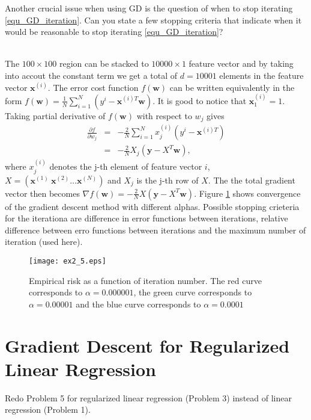 \documentclass[article,11pt]{article}
\begin{document}
Another crucial issue when using GD is the question of when to stop iterating \eqref{equ_GD_iteration}. Can you 
state a few stopping criteria that indicate when it would be reasonable to stop iterating \eqref{equ_GD_iteration}?

\\
The  $100\times 100$ region can be stacked to $10000\times 1$ feature vector and
by taking into accout the constant term we get a total of $d =10001$ elements in
the feature vector $\mathbf{x}^{(i)}$. The error cost function $f(\mathbf{w})$
can be written equivalently in the form $f(\mathbf{w})=\frac{1}{N}\sum_{i=1}^N(y^i-\mathbf{x}^{(i)T}\mathbf{w})$. It is good to notice that  $\mathbf{x}_1^{(i)}=1$. Taking partial derivative of $f(\mathbf{w})$ with respect to $w_j$ gives
\begin{eqnarray}
  \frac{\partial f}{\partial w_j} &=&-\frac{2}{N}\sum_{i=1}^Nx_j^{(i)}(y^i-\mathbf{x}^{(i)T})\nonumber\\
  &=&-\frac{2}{N}X_j(\mathbf{y}-X^T\mathbf{w}),
  \label{eq:partial-derivative}
\end{eqnarray}
where $x_j^{(i)}$ denotes the j-th element of feature vector $i$, $X=(\mathbf{x}^{(1)}\:\mathbf{x}^{(2)} \ldots \mathbf{x}^{(N)})$ and $X_j$ is the j-th row of $X$.
The the total gradient vector then becomes $\nabla f(\mathbf{w})=-\frac{2}{N}X(\mathbf{y}-X^T\mathbf{w})$.
Figure \ref{fig:lineargradientdescent} shows convergence of the gradient descent
method with different alphas. Possible stopping crieteria for the iterationa are
difference in error functions between iterations, relative difference between
erro functions between iterations and the maximum number of iteration
(used here).
\begin{figure}[!h]
  \centering
  \texttt{[image: ex2\_5.eps]}
  \caption{Empirical risk as a function of iteration number. The red curve corresponds to $\alpha=0.000001$, the green curve corresponds to $\alpha=0.00001$ and
the blue curve corresponds to $\alpha=0.0001$}
  \label{fig:lineargradientdescent}
\end{figure}
  


\newpage
\section{Gradient Descent for Regularized Linear Regression}
Redo Problem 5 for regularized linear regression (Problem 3) instead of linear
regression (Problem 1). 
\end{document}
